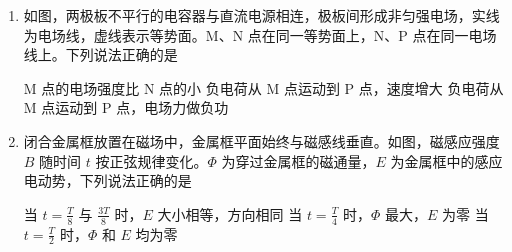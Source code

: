 \documentclass[\gkver]{gaokaozhenti}
\begin{document}
\begin{enumerate}
{联立解得 $v_{1} = v$，$v_{2} = 0$

小球 A 在竖直方向上做匀加速直线运动，则有 $h = \frac{1}{2}gt^{2}$

解得 $t = 2 \Us$

可知，碰撞后，小球 A 运动 $t' = 1 \Us$ 落地，则水平方向上有 $x = vt'$

解得 $v = 3.0 \Ums$

故选 B。
}

\item
如图，两极板不平行的电容器与直流电源相连，极板间形成非匀强电场，实线为电场线，虚线表示等势面。M、N 点在同一等势面上，N、P 点在同一电场线上。下列说法正确的是


{M 点的电场强度比 N 点的小}
{负电荷从 M 点运动到 P 点，速度增大}
{负电荷从 M 点运动到 P 点，电场力做负功}


\item
闭合金属框放置在磁场中，金属框平面始终与磁感线垂直。如图，磁感应强度 $B$ 随时间 $t$ 按正弦规律变化。$\Phi$ 为穿过金属框的磁通量，$E$ 为金属框中的感应电动势，下列说法正确的是

\onepicture[w=5.12cm]{}

{当 $t = \frac{T}{8}$ 与 $\frac{3T}{8}$ 时，$E$ 大小相等，方向相同}
{当 $t = \frac{T}{4}$ 时，$\Phi$ 最大，$E$ 为零}
{当 $t = \frac{T}{2}$ 时，$\Phi$ 和 $E$ 均为零}

\end{enumerate}
\end{document}

